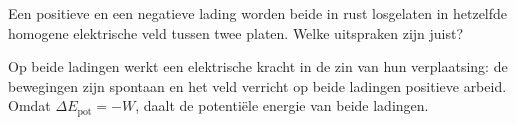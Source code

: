 \documentclass{ximera}
\begin{document}
\begin{question}
    Een positieve en een negatieve lading worden beide in rust losgelaten in hetzelfde homogene elektrische veld tussen twee platen. Welke uitspraken zijn juist?

    \begin{selectAll}
    \end{selectAll}

    \begin{solution}\nl
        Op beide ladingen werkt een elektrische kracht in de zin van hun verplaatsing: de bewegingen zijn spontaan en het veld verricht op beide ladingen positieve arbeid. Omdat $\Delta E_{\text{pot}} = -W$, daalt de potentiële energie van beide ladingen.
    \end{solution}
\end{question}
\end{document}
